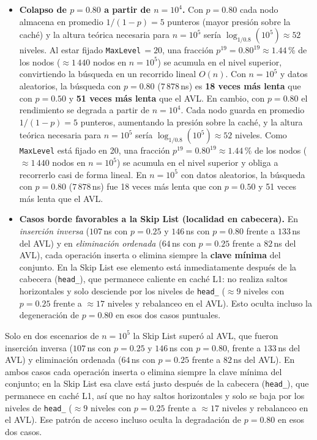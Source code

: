 \documentclass[11pt,a4paper]{article}
\begin{document}
\begin{itemize}
  \item \textbf{Colapso de $p=0.80$ a partir de $n=10^4$.} Con $p = 0.80$ cada
  nodo almacena en promedio $1/(1-p) = 5$ punteros (mayor presión sobre la
  caché) y la altura teórica necesaria para $n = 10^5$ sería
  $\log_{1/0.8}(10^5) \approx 52$ niveles. Al estar fijado
  \texttt{MaxLevel}$\,=20$, una fracción $p^{19} = 0.80^{19} \approx 1.44$\,\%
  de los nodos ($\approx 1\,440$ nodos en $n = 10^5$) se acumula en el nivel
  superior, convirtiendo la búsqueda en un recorrido lineal $O(n)$. Con
  $n=10^5$ y datos aleatorios, la búsqueda con $p=0.80$ ($7\,878$\,ns) es
  \textbf{18 veces más lenta} que con $p=0.50$ y \textbf{51 veces más lenta}
  que el AVL.
En cambio, con $p = 0.80$ el rendimiento se degrada a partir de $n = 10^4$.
Cada nodo guarda en promedio $1/(1-p) = 5$ punteros, aumentando la presión
sobre la caché, y la altura teórica necesaria para $n = 10^5$ sería
$\log_{1/0.8}(10^5) \approx 52$ niveles. Como \texttt{MaxLevel} está fijado en
20, una fracción $p^{19} = 0.80^{19} \approx 1.44$\,\% de los nodos
($\approx 1\,440$ nodos en $n = 10^5$) se acumula en el nivel superior y obliga
a recorrerlo casi de forma lineal. En $n=10^5$ con datos aleatorios, la
búsqueda con $p=0.80$ ($7\,878$\,ns) fue 18 veces más lenta que con $p=0.50$ y
51 veces más lenta que el AVL.

  \item \textbf{Casos borde favorables a la Skip List (localidad en cabecera).}
  En \emph{inserción inversa} ($107$\,ns con $p=0.25$ y $146$\,ns con $p=0.80$
  frente a $133$\,ns del AVL) y en \emph{eliminación ordenada} ($64$\,ns con
  $p=0.25$ frente a $82$\,ns del AVL), cada operación inserta o elimina siempre
  la \textbf{clave mínima} del conjunto. En la Skip List ese elemento está
  inmediatamente después de la cabecera (\texttt{head\_}), que permanece
  caliente en caché L1: no realiza saltos horizontales y solo desciende por los
  niveles de \texttt{head\_} ($\approx 9$ niveles con $p=0.25$ frente a
  $\approx 17$ niveles y rebalanceo en el AVL). Esto oculta incluso la
  degeneración de $p=0.80$ en esos dos casos puntuales.
\end{itemize}
Solo en dos escenarios de $n = 10^5$ la Skip List superó al AVL, que fueron
inserción inversa ($107$\,ns con $p=0.25$ y $146$\,ns con $p=0.80$, frente a
$133$\,ns del AVL) y eliminación ordenada ($64$\,ns con $p=0.25$ frente a
$82$\,ns del AVL). En ambos casos cada operación inserta o elimina siempre la
clave mínima del conjunto; en la Skip List esa clave está justo después de la
cabecera (\texttt{head\_}), que permanece en caché L1, así que no hay saltos
horizontales y solo se baja por los niveles de \texttt{head\_} ($\approx 9$
niveles con $p=0.25$ frente a $\approx 17$ niveles y rebalanceo en el AVL). Ese
patrón de acceso incluso oculta la degradación de $p=0.80$ en esos dos casos.
\end{document}
